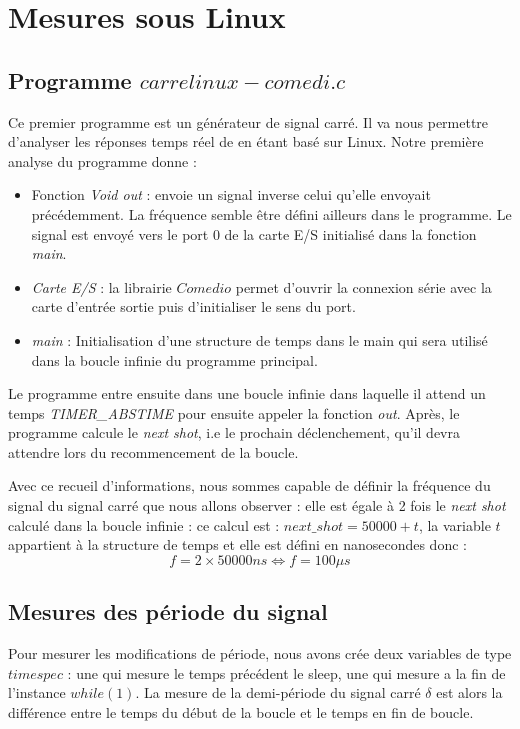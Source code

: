 \section{Mesures sous Linux}
\subsection{Programme $carrelinux-comedi.c$}
Ce premier programme est un générateur de signal carré. Il va nous permettre d'analyser les réponses temps réel de en étant basé sur Linux. Notre première analyse du programme donne :\begin{itemize}
\item Fonction \emph{Void out} : envoie un signal inverse  celui qu'elle envoyait précédemment. La fréquence semble être défini ailleurs dans le programme. Le signal est envoyé vers le port 0 de la carte E/S initialisé dans la fonction \emph{main}.
\item \emph{Carte E/S} : la librairie $Comedio$ permet d'ouvrir la connexion série avec la carte d'entrée sortie puis d'initialiser le sens du port.
\item \emph{main} : Initialisation d'une structure de temps dans le main qui sera utilisé dans la boucle infinie du programme principal.
\end{itemize}
Le programme entre ensuite dans une boucle infinie dans laquelle il attend un temps \emph{TIMER\_ABSTIME} pour ensuite appeler la fonction \emph{out}. Après, le programme calcule le \emph{next shot}, i.e le prochain déclenchement, qu'il devra attendre lors du recommencement de la boucle.

Avec ce recueil d'informations, nous sommes capable de définir la fréquence du signal du signal carré que nous allons observer : elle est égale à 2 fois le \emph{next shot} calculé dans la boucle infinie : ce calcul est : $next\_shot = 50 000 + t$, la variable $t$ appartient à la structure de temps et elle est défini en nanosecondes donc : \begin{equation}
f = 2\times 50 000ns \Leftrightarrow f= 100\mu s
\end{equation} 

\subsection{Mesures des période du signal}
Pour mesurer les modifications de période, nous avons crée deux variables de type $timespec$ : une qui mesure le temps précédent le sleep, une qui mesure a la fin de l'instance $while(1)$. La mesure de la demi-période du signal carré $\delta$ est alors la différence entre le temps du début de la boucle et le temps en fin de boucle.  


